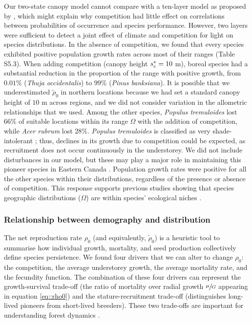 Our two-state canopy model cannot compare with a ten-layer model as proposed by \citet{Lischke1998}, which might explain why competition had little effect on correlations between probabilities of occurrence and species performance. However, two layers were sufficient to detect a joint effect of climate and competition for light on species distributions. In the absence of competition, we found that every species exhibited positive population growth rates across most of their ranges (Table S5.3). When adding competition (canopy height $ {s}^{*}_c = 10 $ m), boreal species had a substantial reduction in the proportion of the range with positive growth, from $ 0.01 \% $ (\textit{Thuja occidentalis}) to $ 99 \% $ (\textit{Pinus banksiana}). It is possible that we underestimated $ \tilde \rho_0 $ in northern locations because we had set a standard canopy height of $ 10 $ m across regions, and we did not consider variation in the allometric relationships that we used. Among the other species, \textit{Populus tremuloides} lost $ 66 \% $ of suitable locations within its range $ \Omega $ with the addition of competition, while \textit{Acer rubrum} lost $ 28 \% $. \textit{Populus tremuloides} is classified as very shade-intolerant \citep{Burns1990a}; thus, declines in its growth due to competition could be expected, as recruitment does not occur continuously in the understorey. We did not include disturbances in our model, but these may play a major role in maintaining this pioneer species in Eastern Canada \citep{Nlungu-Kweta2017}. Population growth rates were positive for all the other species within their distributions, regardless of the presence or absence of competition. This response supports previous studies showing that species geographic distributions ($ \Omega $) are within species' ecological niches \citep{Lee-Yaw2016, Csergo2017}.

\subsubsection{Relationship between demography and distribution}
The net reproduction rate $ \rho_0 $ (and equivalently, $ \tilde \rho_0 $) is a heuristic tool to summarise how individual growth, mortality, and seed production collectively define species persistence. We found four drivers that we can alter to change $ \rho_0 $: the competition, the average understorey growth, the average mortality rate, and the fecundity function. The combination of these four drivers can represent the growth-survival trade-off (\eg the ratio of mortality over radial growth $ \sfrac{\mu}{G} $ appearing in equation \eqref{eq::rho0}) and the stature-recruitment trade-off (distinguishes long-lived pioneers from short-lived breeders). These two trade-offs are important for understanding forest dynamics \citep[for tropical forest]{Ruger2020}. \\

